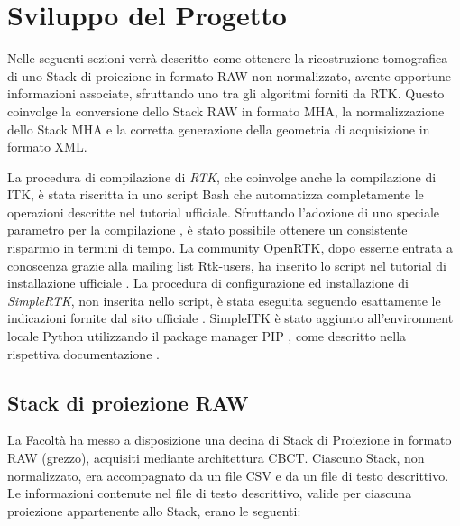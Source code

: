 \documentclass[a4paper,12pt, doubleside]{report}
\begin{document}
                                              
    \chapter{Sviluppo del Progetto}
        \par
            Nelle seguenti sezioni verrà descritto come ottenere la ricostruzione tomografica di uno Stack di proiezione in formato RAW non normalizzato, avente opportune informazioni associate, sfruttando uno tra gli algoritmi forniti da RTK. Questo coinvolge la conversione dello Stack RAW in formato MHA, la normalizzazione dello Stack MHA e la corretta generazione della geometria di acquisizione in formato XML. 
            
        \bigskip
        \par
            La procedura di compilazione di \textit{RTK}, che coinvolge anche la compilazione di ITK, è stata riscritta in uno script Bash \cite{script-bash} che automatizza completamente le operazioni descritte nel tutorial ufficiale. Sfruttando l'adozione di uno speciale parametro per la compilazione \cite{parallel-j}, è stato possibile ottenere un consistente risparmio in termini di tempo. La community OpenRTK, dopo esserne entrata a conoscenza grazie alla mailing list Rtk-users, ha inserito lo script nel tutorial di installazione ufficiale \cite{wiki-rtk}. La procedura di configurazione ed installazione di \textit{SimpleRTK}, non inserita nello script, è stata eseguita seguendo esattamente le indicazioni fornite dal sito ufficiale \cite{simplertk-install}. SimpleITK è stato aggiunto all'environment locale Python utilizzando il package manager PIP \cite{python-pip}, come descritto nella rispettiva documentazione \cite{simpleitk-install}.

        \section{Stack di proiezione RAW}
            \par
                La Facoltà ha messo a disposizione una decina di Stack di Proiezione in formato RAW (grezzo), acquisiti mediante architettura CBCT. Ciascuno Stack, non normalizzato, era accompagnato da un file CSV e da un file di testo descrittivo. Le informazioni contenute nel file di testo descrittivo, valide per ciascuna proiezione appartenente allo Stack, erano le seguenti:
                    
\end{document}
